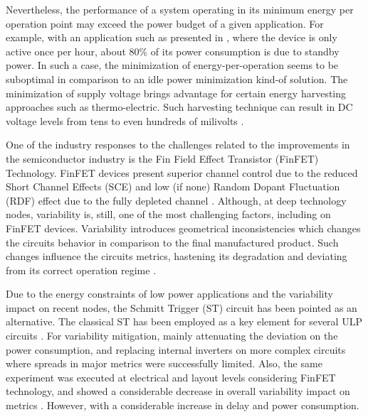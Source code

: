 \documentclass[diss,pgmicro,english]{iiufrgs}
\begin{document}
    Nevertheless, the performance of a system operating in its minimum energy per operation point may exceed the power budget of a given application. For example, with an application such as presented in \cite{fojtik2013millimeter}, where the device is only active once per hour, about 80\% of its power consumption is due to standby power. In such a case, the minimization of energy-per-operation seems to be suboptimal in comparison to an idle power minimization kind-of solution. The minimization of supply voltage brings advantage for certain energy harvesting approaches such as thermo-electric. Such harvesting technique can result in DC voltage levels from tens to even hundreds of milivolts \cite{khan2014flexible}.

    One of the industry responses to the challenges related to the improvements in the semiconductor industry is the Fin Field Effect Transistor (FinFET) Technology. FinFET devices present superior channel control due to the reduced Short Channel Effects (SCE) and low (if none) Random Dopant Fluctuation (RDF) effect due to the fully depleted channel \cite{farkhani2014comparative}. Although, at deep technology nodes, variability is, still, one of the most challenging factors, including on FinFET devices. Variability introduces geometrical inconsistencies which changes the circuits behavior in comparison to the final manufactured product. Such changes influence the circuits metrics, hastening its degradation and deviating from its correct operation regime \cite{abbas:15} \cite{nassif:08}.

    Due to the energy constraints of low power applications and the variability impact on recent nodes, the Schmitt Trigger (ST) circuit has been pointed as an alternative. The classical ST has been employed as a key element for several ULP circuits \cite{kulkarni2007160, 5746345, melek:17, lotze2017ultra}. For variability mitigation, mainly attenuating the deviation on the power consumption, and replacing internal inverters on more complex circuits \cite{dokania2015circuit} where spreads in major metrics were successfully limited. Also, the same experiment was executed at electrical and layout levels considering FinFET technology, and showed a considerable decrease in overall variability impact on metrics \cite{toledo2018pros,moraes2018evaluation}. However, with a considerable increase in delay and power consumption.

\end{document}
